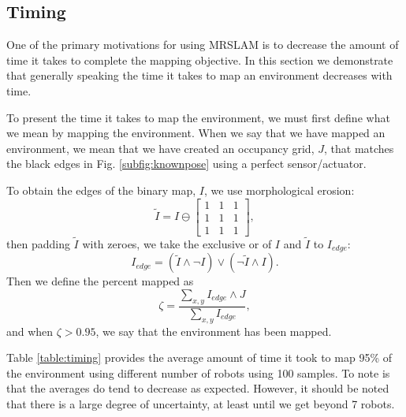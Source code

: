 \subsection{Timing}
\label{S:Exp:Timing}

One of the primary motivations for using MRSLAM is to decrease the amount of time it takes to complete the mapping objective.  In this section we demonstrate that generally speaking the time it takes to map an environment decreases with time.  

To present the time it takes to map the environment, we must first define what we mean by mapping the environment.  When we say that we have mapped an environment, we mean that we have created an occupancy grid, $J$, that matches the black edges in Fig. \ref{subfig:knownpose} using a perfect sensor/actuator.  

To obtain the edges of the binary map, $I$, we use morphological erosion:
\begin{equation}
\tilde{I}=I\ominus \begin{bmatrix}
1 & 1 & 1 \\
1 & 1 & 1 \\
1 & 1 & 1
\end{bmatrix},
\end{equation}
then padding $\tilde{I}$ with zeroes, we take the exclusive or of $I$ and $\tilde{I}$ to $I_{edge}$:
\begin{equation}
I_{edge}=(\tilde{I}\wedge \neg I)\vee (\neg \tilde{I}\wedge I).
\end{equation}
Then we define the percent mapped as
\begin{equation}
\zeta =\frac{\sum_{x,y}I_{edge}\wedge J}{\sum_{x,y}I_{edge}},
\end{equation}
and when $\zeta>0.95$, we say that the environment has been mapped.

Table \ref{table:timing} provides the average amount of time it took to map 95\% of the environment using different number of robots using 100 samples.  To note is that the averages do tend to decrease as expected.  However, it should be noted that there is a large degree of uncertainty, at least until we get beyond 7 robots.  

